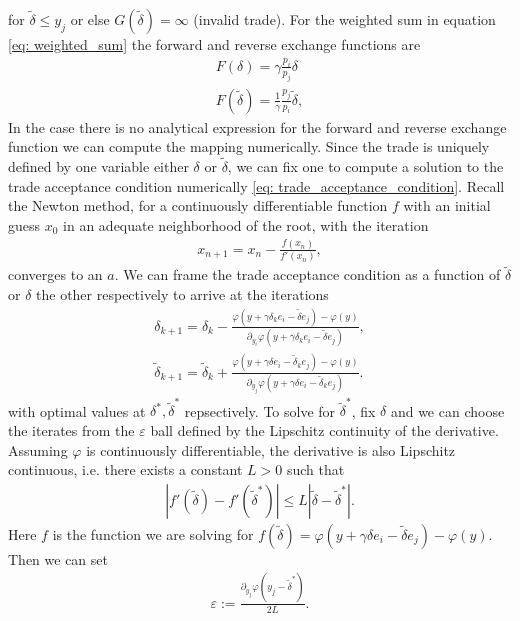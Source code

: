 for $\tilde{\delta} \le y_j$ or else $G(\tilde{\delta}) = \infty$ (invalid
trade).
For the weighted sum in equation \ref{eq: weighted_sum} the forward and
reverse exchange functions are
\begin{align}
    F(\delta) = \gamma \frac{p_i}{p_j}\delta \\
    F(\tilde{\delta}) = \frac{1}{\gamma} \frac{p_j}{p_i}\tilde{\delta},
\end{align}
In the case there is no analytical expression for the forward and reverse
exchange function we can compute the mapping numerically. Since the trade is
uniquely defined by one variable either $\delta$ or $\tilde{\delta}$, we can
fix one to compute a solution to the trade acceptance condition numerically
\ref{eq: trade_acceptance_condition}. Recall the Newton method, for a
continuously differentiable function $f$ with an initial guess
$x_0$ in an adequate neighborhood of the root, with the iteration
\begin{align}
    x_{n+1} = x_n - \frac{f(x_n)}{f'(x_n)},
\end{align}
converges to an $a$. We can frame the trade acceptance condition as a
function of $\tilde{\delta}$ or $\delta$ the other respectively to arrive at
the iterations
\begin{align}
    \delta_{k+1} = \delta_k - \frac{\varphi(y+\gamma\delta_k e_i
    -\tilde{\delta}e_j) -\varphi(y)}{\partial_{y_i}\varphi(y+\gamma\delta_k e_i
-\tilde{\delta}e_j)},\\
\tilde{\delta}_{k+1} = \tilde{\delta}_k + \frac{\varphi(y+\gamma\delta e_i
    -\tilde{\delta}_ke_j) -\varphi(y)}{\partial_{y_j}\varphi(y+\gamma\delta e_i
-\tilde{\delta}_k e_j)}.
\end{align}
with optimal values at $\delta^{*}, \tilde{\delta}^{*}$ repsectively.
To solve for $\tilde{\delta}^{*}$, fix $\delta$ and we can choose the
iterates from the $\varepsilon$ ball defined by the Lipschitz continuity of
the derivative. Assuming $\varphi$ is continuously differentiable, the
derivative is also Lipschitz continuous, i.e. there exists a constant $L > 0$
such that
\begin{align}
   |f'(\tilde{\delta}) - f'(\tilde{\delta}^{*})|  \le L |\tilde{\delta} -
   \tilde{\delta}^{*} |.
\end{align}
Here $f$ is the function we are solving for $f(\tilde{\delta}) = \varphi(y
+\gamma \delta e_i -\tilde{\delta}e_j) - \varphi(y)$. Then we can set
\begin{align}
    \varepsilon := \frac{\partial_{y_j}\varphi(y_j - \tilde{\delta}^{*}
    )}{2L}.
\end{align}
